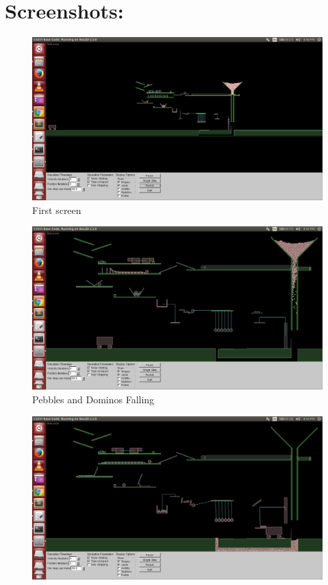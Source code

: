 \documentclass{article}
\begin{document}
\section*{Screenshots:}
\begin{figure} [h]
    \centering
    \includegraphics [scale=0.18] {screenshots/screenshot3.png}
    \caption{First screen}
\end{figure} 

\begin{figure} [h]
    \centering
    \includegraphics [scale=0.18] {screenshots/screenshot1.png}
    \caption{Pebbles and Dominos Falling}
\end{figure} 

\begin{figure} [h]
    \centering
    \includegraphics [scale=0.18] {screenshots/screenshot2.png}
    \caption{}
\end{figure} 
\newpage
\end{document}
